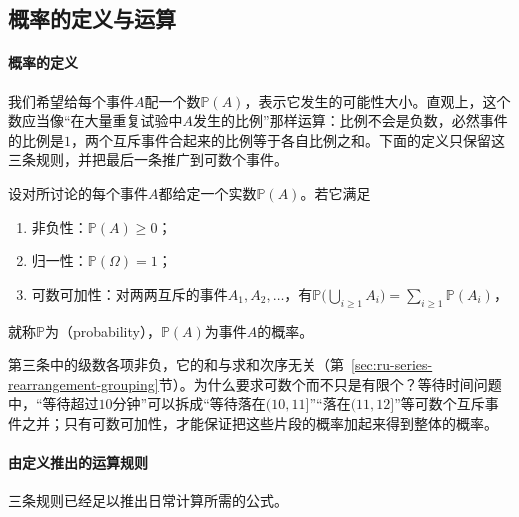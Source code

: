 \subsection{概率的定义与运算}
\label{sec:prob-probability-rules}

\paragraph{概率的定义}
我们希望给每个事件$A$配一个数$\mathbb{P}(A)$，表示它发生的可能性大小。直观上，这个数应当像“在大量重复试验中$A$发生的比例”那样运算：比例不会是负数，必然事件的比例是$1$，两个互斥事件合起来的比例等于各自比例之和。下面的定义只保留这三条规则，并把最后一条推广到可数个事件。

\begin{definition}[概率]
\label{def:prob-probability}
设对所讨论的每个事件$A$都给定一个实数$\mathbb{P}(A)$。若它满足
\begin{enumerate}
  \item 非负性：$\mathbb{P}(A)\geq0$；
  \item 归一性：$\mathbb{P}(\Omega)=1$；
  \item 可数可加性：对两两互斥的事件$A_1,A_2,\dots$，有$\mathbb{P}\bigl(\bigcup_{i\geq1}A_i\bigr)=\sum_{i\geq1}\mathbb{P}(A_i)$，
\end{enumerate}
就称$\mathbb{P}$为（probability），$\mathbb{P}(A)$为事件$A$的概率。
\end{definition}

第三条中的级数各项非负，它的和与求和次序无关（第~\ref{sec:ru-series-rearrangement-grouping}节）。为什么要求可数个而不只是有限个？等待时间问题中，“等待超过$10$分钟”可以拆成“等待落在$(10,11]$”“落在$(11,12]$”等可数个互斥事件之并；只有可数可加性，才能保证把这些片段的概率加起来得到整体的概率。

\paragraph{由定义推出的运算规则}
三条规则已经足以推出日常计算所需的公式。

